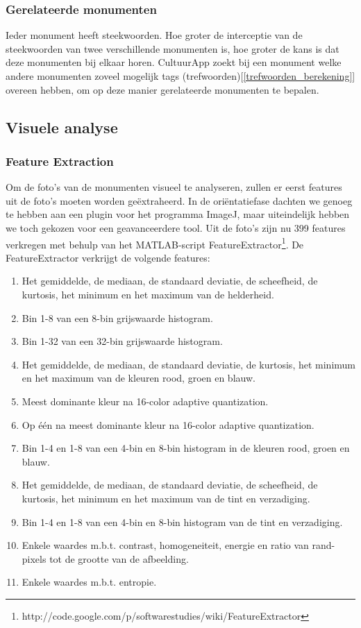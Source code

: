 \documentclass[a4paper,10pt]{article}
\begin{document}
		\subsubsection{Gerelateerde monumenten}
		Ieder monument heeft steekwoorden. Hoe groter de interceptie van de steekwoorden van twee verschillende monumenten is, hoe groter de kans is dat deze monumenten bij elkaar horen. CultuurApp zoekt bij een monument welke andere monumenten zoveel mogelijk tags (trefwoorden)[\ref{trefwoorden_berekening}] overeen hebben, om op deze manier gerelateerde monumenten te bepalen.

	\subsection{Visuele analyse}		
		\subsubsection{Feature Extraction}
		Om de foto's van de monumenten visueel te analyseren, zullen er eerst features uit de foto's moeten worden ge\"extraheerd. In de ori\"entatiefase dachten we genoeg te hebben aan een plugin voor het programma ImageJ, maar uiteindelijk hebben we toch gekozen voor een geavanceerdere tool. Uit de foto's zijn nu 399 features verkregen met behulp van het MATLAB-script FeatureExtractor\footnote{http://code.google.com/p/softwarestudies/wiki/FeatureExtractor}. De FeatureExtractor verkrijgt de volgende features:
		\begin{enumerate}
			\item Het gemiddelde, de mediaan, de standaard deviatie, de scheefheid, de kurtosis, het minimum en het maximum van de helderheid.
			\item Bin 1-8 van een 8-bin grijswaarde histogram.
			\item Bin 1-32 van een 32-bin grijswaarde histogram.
			\item Het gemiddelde, de mediaan, de standaard deviatie, de kurtosis, het minimum en het maximum van de kleuren rood, groen en blauw.
			\item Meest dominante kleur na 16-color adaptive quantization.
			\item Op \'e\'en na meest dominante kleur na 16-color adaptive quantization.
			\item Bin 1-4 en 1-8 van een 4-bin en 8-bin histogram in de kleuren rood, groen en blauw.
			\item Het gemiddelde, de mediaan, de standaard deviatie, de scheefheid, de kurtosis, het minimum en het maximum van de tint en verzadiging.
			\item Bin 1-4 en 1-8 van een 4-bin en 8-bin histogram van de tint en verzadiging.
			\item Enkele waardes m.b.t. contrast, homogeneiteit, energie en ratio van rand-pixels tot de grootte van de afbeelding.
			\item Enkele waardes m.b.t. entropie.
		\end{enumerate}
\end{document}
